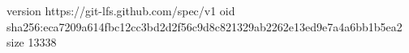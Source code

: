 version https://git-lfs.github.com/spec/v1
oid sha256:eca7209a614fbc12cc3bd2d2f56c9d8c821329ab2262e13ed9e7a4a6bb1b5ea2
size 13338
